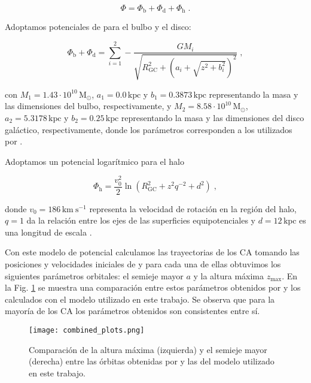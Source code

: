 \documentclass[baaa]{baaa}
\begin{document}
\begin{equation}
    \Phi = \Phi_{\mathrm{b}} + \Phi_{\mathrm{d}} + \Phi_{\mathrm{h}} \;.
\end{equation}

Adoptamos potenciales de \cite{MiyamotoNagai} para el bulbo y el disco:

\begin{equation}
    \Phi_{\mathrm{b}} + \Phi_{\mathrm{d}} = \sum_{i=1}^{2} -\frac{GM_i}{\sqrt{R_{\mathrm{GC}}^{2}+\left(a_i+\sqrt{z^{2}+b_i^{2}}\right)^{2}}} \;,
\end{equation}

\noindent con $M_1 = 1.43 \cdot 10^{10} \, \mathrm{M_\odot}$, $a_1 = 0.0 \, \mathrm{kpc}$ y $b_1 = 0.3873 \, \mathrm{kpc}$ representando la masa y las dimensiones del bulbo, respectivamente, y $M_2 = 8.58 \cdot 10^{10} \, \mathrm{M_\odot}$, $a_2 = 5.3178 \, \mathrm{kpc}$ y $b_2 = 0.25 \, \mathrm{kpc}$ representando la masa y las dimensiones del disco galáctico, respectivamente, donde los parámetros corresponden a los utilizados por \cite{Allen_&_Santillan}.

Adoptamos un potencial logarítmico para el halo

\begin{equation}
    \Phi_{\mathrm{h}} = \frac{v_0^{2}}{2}\ln{(R_{\mathrm{GC}}^{2}+z^{2}q^{-2}+d^{2})} \;,
\end{equation}

\noindent donde $v_0 = 186 \, \mathrm{km~s^{-1}}$ representa la velocidad de rotación en la región del halo, $q=1$ da la relación entre los ejes de las superficies equipotenciales y $d=12 \, \mathrm{kpc}$ es una longitud de escala \citep{Vande_Putte}. 

Con este modelo de potencial calculamos las trayectorias de los CA tomando las posiciones y velocidades iniciales de \cite{Wu} y para cada una de ellas obtuvimos los siguientes parámetros orbitales: el semieje mayor $a$ y la altura máxima $z_{\mathrm{max}}$. En la Fig. \ref{fig:comparacion_de_parametros} se muestra una comparación entre estos parámetros obtenidos por \cite{Wu} y los calculados con el modelo utilizado en este trabajo. Se observa que para la mayoría de los CA los parámetros obtenidos son consistentes entre sí.

\begin{figure}[!ht]
    \centering
    \texttt{[image: combined\_plots.png]}
    \caption{Comparación de la altura máxima (izquierda) y el semieje mayor (derecha) entre las órbitas obtenidas por \cite{Wu} y las del modelo utilizado en este trabajo.}
    \label{fig:comparacion_de_parametros}
\end{figure}
\end{document}
